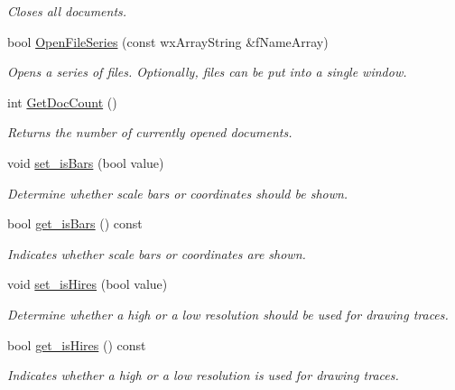 \begin{DoxyCompactItemize}
\begin{DoxyCompactList}\small\item\em Closes all documents. \item\end{DoxyCompactList}\item 
bool \hyperlink{classwxStfApp_ae091bc0de048b5386379f934a71f3d20}{OpenFileSeries} (const wxArrayString \&fNameArray)
\begin{DoxyCompactList}\small\item\em Opens a series of files. Optionally, files can be put into a single window. \item\end{DoxyCompactList}\item 
int \hyperlink{classwxStfApp_a09fd899d6efaca715f7e22dd1ddb3ccf}{GetDocCount} ()
\begin{DoxyCompactList}\small\item\em Returns the number of currently opened documents. \item\end{DoxyCompactList}\item 
void \hyperlink{classwxStfApp_a876a3f37ff3cd08ac00fa4ef6b1b2c5d}{set\_\-isBars} (bool value)
\begin{DoxyCompactList}\small\item\em Determine whether scale bars or coordinates should be shown. \item\end{DoxyCompactList}\item 
bool \hyperlink{classwxStfApp_a2d731c3c77d94fe13ad8184fa1f5cb5f}{get\_\-isBars} () const 
\begin{DoxyCompactList}\small\item\em Indicates whether scale bars or coordinates are shown. \item\end{DoxyCompactList}\item 
void \hyperlink{classwxStfApp_a19263b9dec3c8506d801c3becada2a18}{set\_\-isHires} (bool value)
\begin{DoxyCompactList}\small\item\em Determine whether a high or a low resolution should be used for drawing traces. \item\end{DoxyCompactList}\item 
bool \hyperlink{classwxStfApp_a73345a1fd9b9f33f5aaf8d7f5a2c1df3}{get\_\-isHires} () const 
\begin{DoxyCompactList}\small\item\em Indicates whether a high or a low resolution is used for drawing traces. \item\end{DoxyCompactList}\item 

\end{DoxyCompactItemize}
